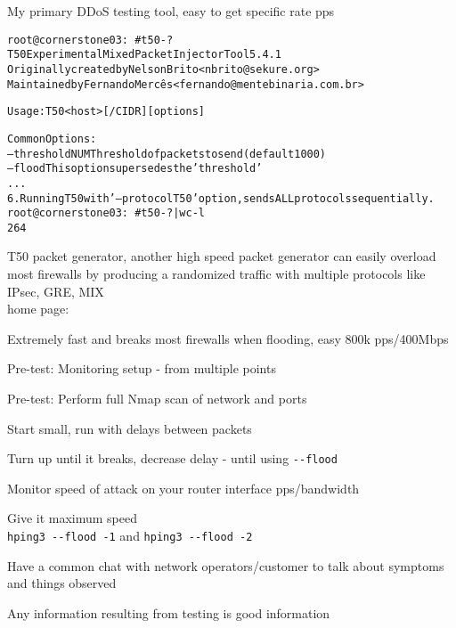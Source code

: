 \documentclass[Screen16to9,17pt]{foils}
\begin{document}
\centerline{My primary DDoS testing tool, easy to get specific rate pps}



\begin{alltt}\footnotesize
root@cornerstone03:~# t50 -?
T50 Experimental Mixed Packet Injector Tool 5.4.1
Originally created by Nelson Brito <nbrito@sekure.org>
Maintained by Fernando Mercês <fernando@mentebinaria.com.br>

Usage: T50 <host> [/CIDR] [options]

Common Options:
    --threshold NUM        Threshold of packets to send     (default 1000)
    --flood                This option supersedes the 'threshold'
...
6. Running T50 with '--protocol T50' option, sends ALL protocols sequentially.
root@cornerstone03:~# t50 -? | wc -l
264
\end{alltt}

\begin{list2}
\item T50 packet generator, another high speed packet generator
can easily overload most firewalls by producing a randomized traffic with multiple protocols like IPsec, GRE, MIX \\
home page: 
\end{list2}

\centerline{Extremely fast and breaks most firewalls when flooding, easy 800k pps/400Mbps}


\begin{list2}
\item Pre-test: Monitoring setup - from multiple points
\item Pre-test: Perform full Nmap scan of network and ports
\item Start small, run with delays between packets
\item Turn up until it breaks, decrease delay - until using \verb+--flood+
\item Monitor speed of attack on your router interface pps/bandwidth
\item Give it maximum speed\\
 \verb+hping3 --flood -1+ and \verb+hping3 --flood -2+
\item Have a common chat with network operators/customer to talk about symptoms and things observed
\item Any information resulting from testing is good information
\end{list2}
\end{document}
